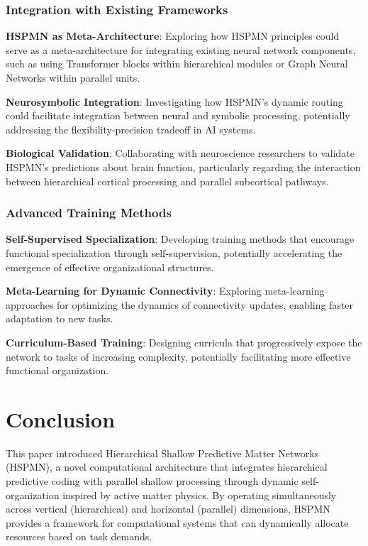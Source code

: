 \documentclass[11pt,a4paper,twocolumn]{article}
\begin{document}
\subsubsection{Integration with Existing Frameworks}

\textbf{HSPMN as Meta-Architecture}: Exploring how HSPMN principles could serve as a meta-architecture for integrating existing neural network components, such as using Transformer blocks within hierarchical modules or Graph Neural Networks within parallel units.

\textbf{Neurosymbolic Integration}: Investigating how HSPMN's dynamic routing could facilitate integration between neural and symbolic processing, potentially addressing the flexibility-precision tradeoff in AI systems.

\textbf{Biological Validation}: Collaborating with neuroscience researchers to validate HSPMN's predictions about brain function, particularly regarding the interaction between hierarchical cortical processing and parallel subcortical pathways.

\subsubsection{Advanced Training Methods}

\textbf{Self-Supervised Specialization}: Developing training methods that encourage functional specialization through self-supervision, potentially accelerating the emergence of effective organizational structures.

\textbf{Meta-Learning for Dynamic Connectivity}: Exploring meta-learning approaches for optimizing the dynamics of connectivity updates, enabling faster adaptation to new tasks.

\textbf{Curriculum-Based Training}: Designing curricula that progressively expose the network to tasks of increasing complexity, potentially facilitating more effective functional organization.

\section{Conclusion}

This paper introduced Hierarchical Shallow Predictive Matter Networks (HSPMN), a novel computational architecture that integrates hierarchical predictive coding with parallel shallow processing through dynamic self-organization inspired by active matter physics. By operating simultaneously across vertical (hierarchical) and horizontal (parallel) dimensions, HSPMN provides a framework for computational systems that can dynamically allocate resources based on task demands.
\end{document}
